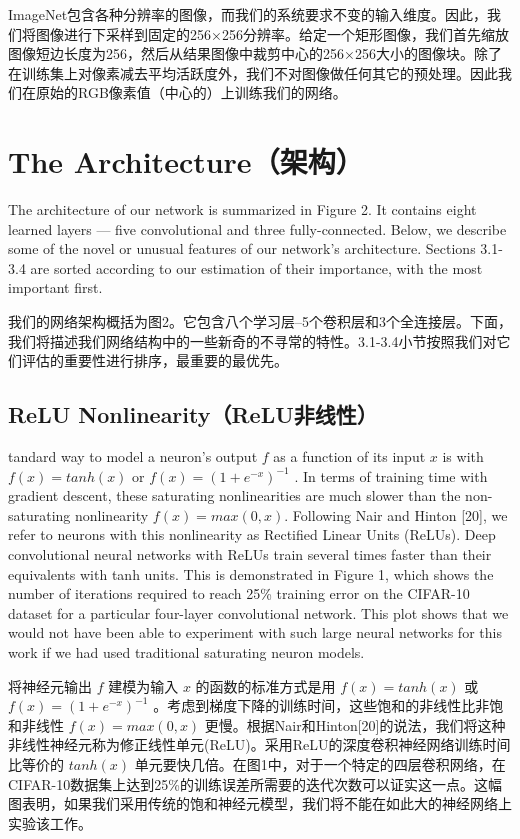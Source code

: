 \documentclass[12pt,a4paper,UTF8,twoside]{book}
\begin{document}
ImageNet包含各种分辨率的图像，而我们的系统要求不变的输入维度。因此，我们将图像进行下采样到固定的256×256分辨率。给定一个矩形图像，我们首先缩放图像短边长度为256，然后从结果图像中裁剪中心的256×256大小的图像块。除了在训练集上对像素减去平均活跃度外，我们不对图像做任何其它的预处理。因此我们在原始的RGB像素值（中心的）上训练我们的网络。

\hypertarget{the-architectureux67b6ux6784}{%
\section{The Architecture（架构）}\label{the-architectureux67b6ux6784}}

The architecture of our network is summarized in Figure 2. It contains eight learned layers --- five convolutional and three fully-connected. Below, we describe some of the novel or unusual features of our network's architecture. Sections 3.1-3.4 are sorted according to our estimation of their importance, with the most important first.

我们的网络架构概括为图2。它包含八个学习层--5个卷积层和3个全连接层。下面，我们将描述我们网络结构中的一些新奇的不寻常的特性。3.1-3.4小节按照我们对它们评估的重要性进行排序，最重要的最优先。

\hypertarget{relu-nonlinearityreluux975eux7ebfux6027}{%
\subsection{ReLU Nonlinearity（ReLU非线性）}\label{relu-nonlinearityreluux975eux7ebfux6027}}

tandard way to model a neuron's output \(f\) as a function of its input \(x\) is with \(f(x) = tanh(x)\) or \(f(x) = (1 + e^{−x} )^{−1}\) . In terms of training time with gradient descent, these saturating nonlinearities are much slower than the non-saturating nonlinearity \(f(x) = max(0, x)\). Following Nair and Hinton {[}20{]}, we refer to neurons with this nonlinearity as Rectified Linear Units (ReLUs). Deep convolutional neural networks with ReLUs train several times faster than their equivalents with tanh units. This is demonstrated in Figure 1, which shows the number of iterations required to reach 25\% training error on the CIFAR-10 dataset for a particular four-layer convolutional network. This plot shows that we would not have been able to experiment with such large neural networks for this work if we had used traditional saturating neuron models.

将神经元输出 \(f\) 建模为输入 \(x\) 的函数的标准方式是用 \(f(x) = tanh(x)\) 或 \(f(x) = (1 + e^{−x} )^{−1}\) 。考虑到梯度下降的训练时间，这些饱和的非线性比非饱和非线性 \(f(x) = max(0, x)\) 更慢。根据Nair和Hinton{[}20{]}的说法，我们将这种非线性神经元称为修正线性单元(ReLU)。采用ReLU的深度卷积神经网络训练时间比等价的 \(tanh(x)\) 单元要快几倍。在图1中，对于一个特定的四层卷积网络，在CIFAR-10数据集上达到25\%的训练误差所需要的迭代次数可以证实这一点。这幅图表明，如果我们采用传统的饱和神经元模型，我们将不能在如此大的神经网络上实验该工作。
\end{document}
